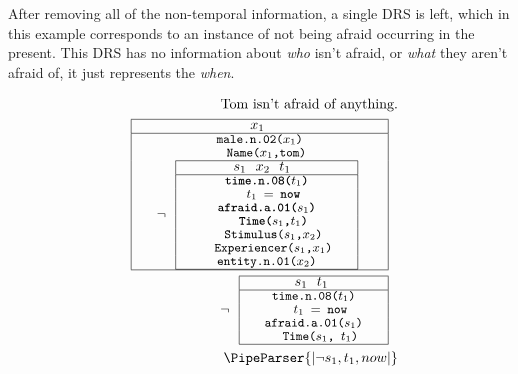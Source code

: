 \documentclass[a4paper,12pt,leqno]{article}
\def\drs#1#2{
\renewcommand{\arraystretch}{0.8}
\begin{tabular}[c]{|>{\hspace{1pc}}c<{\hspace{1pc}}|}
	\hline #1 \\
	\hline #2 \\
	\hline
\end{tabular}
\renewcommand{\arraystretch}{1}
}
\newcommand{\vph}[1]{\vphantom{#1}}
\newcommand{\ebox}[1]{\fbox{$\vph{'(),}#1$}}
\newcommand{\EventString}[1]{%
	\renewcommand*{\do}[1]{\ebox{##1}}%
	\PipeParser{#1}%
}
\begin{document}
After removing all of the non-temporal information, a single DRS is left, which in this example corresponds to an instance of not being afraid occurring in the present. This DRS has no information about \textit{who} isn't afraid, or \textit{what} they aren't afraid of, it just represents the \textit{when}.

\begingroup
\setlength{\abovedisplayskip}{-10pt}%
\setlength{\belowdisplayskip}{0pt}%
\setlength{\abovedisplayshortskip}{-10pt}%
\setlength{\belowdisplayshortskip}{0pt}%

\begin{subequations}
	\label{ex:drs-example}
	\begin{align}
	\text{Tom isn't afraid of anything.}\label{ex:drs-example-a}\\
	\text{\drs{$x_1$ \hfill}{
		{\small\texttt{male.n.02($x_1$)}}\\
		{\small\texttt{~~Name($x_1$,tom)}}\\
		$\neg{}$ \drs{$s_1$~~$x_2$~~$t_1$~ \hfill}{
			{\small\textbf{\texttt{time.n.08($t_1$)}}}\\
			{\small\textbf{\texttt{~~$t_1$ $=$ now}}}\\
			{\small\textbf{\texttt{afraid.a.01($s_1$)}}}\\
			{\small\textbf{\texttt{~~Time($s_1$,$t_1$)}}}\\
			{\small\texttt{~~Stimulus($s_1$,$x_2$)}}\\
			{\small\texttt{~~Experiencer($s_1$,$x_1$)}}\\
			{\small\texttt{entity.n.01($x_2$)}}
		}
	}}\label{ex:drs-example-b}\\
	\text{$\neg{}$ \drs{$s_1$~~$t_1$ \hfill}{
		{\small\texttt{time.n.08($t_1$)}}\\
		{\small\texttt{~~$t_1$ $=$ now}}\\
		{\small\texttt{afraid.a.01($s_1$)}}\\
		{\small\texttt{~~Time($s_1$, $t_1$)}}
	}}\label{ex:drs-example-c}\\
	\EventString{|\neg{} s_1, t_1, now|}\label{ex:drs-example-d}
	\end{align}
\end{subequations}
\endgroup
\end{document}
